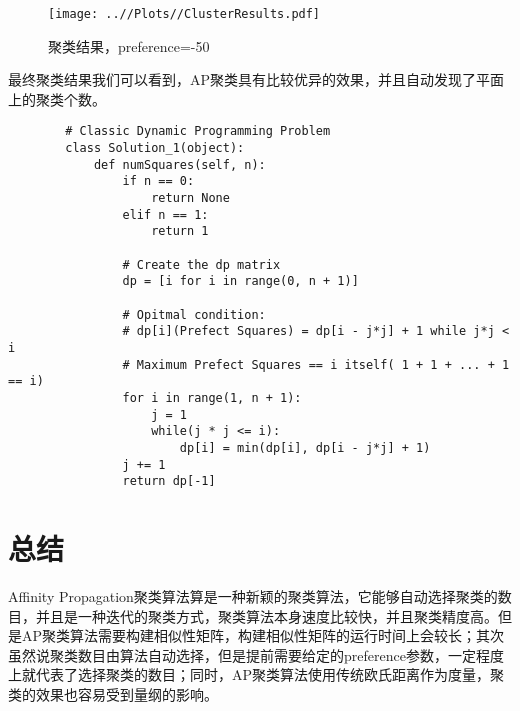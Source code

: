 \documentclass[UTF8, 12pt]{ctexart}
\begin{document}
	\begin{figure}[H]
		\centering
		\texttt{[image: ..//Plots//ClusterResults.pdf]}
		\caption{聚类结果，preference=-50}
		\label{Fig:4}
		\vspace{-0.5em}
	\end{figure}
	最终聚类结果我们可以看到，AP聚类具有比较优异的效果，并且自动发现了平面上的聚类个数。
	
	\begin{lstlisting}
		# Classic Dynamic Programming Problem
		class Solution_1(object):
			def numSquares(self, n):
				if n == 0:
					return None
				elif n == 1:
					return 1
				
				# Create the dp matrix
				dp = [i for i in range(0, n + 1)]
				
				# Opitmal condition:
				# dp[i](Prefect Squares) = dp[i - j*j] + 1 while j*j < i
				# Maximum Prefect Squares == i itself( 1 + 1 + ... + 1 == i)
				for i in range(1, n + 1):
					j = 1
					while(j * j <= i):
						dp[i] = min(dp[i], dp[i - j*j] + 1)
				j += 1
				return dp[-1]
	\end{lstlisting}

	\section{总结}
	Affinity Propagation聚类算法算是一种新颖的聚类算法，它能够自动选择聚类的数目，并且是一种迭代的聚类方式，聚类算法本身速度比较快，并且聚类精度高\cite{frey2007clustering}。但是AP聚类算法需要构建相似性矩阵，构建相似性矩阵的运行时间上会较长；其次虽然说聚类数目由算法自动选择，但是提前需要给定的preference参数，一定程度上就代表了选择聚类的数目；同时，AP聚类算法使用传统欧氏距离作为度量，聚类的效果也容易受到量纲的影响\cite{唐丹2017改进的近邻传播聚类算法及其应用研究}。
	
	  
	  
\end{document}
